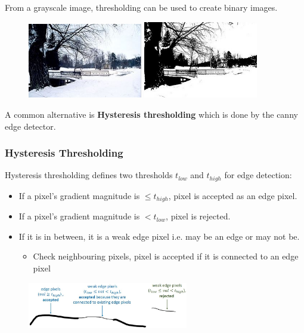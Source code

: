 \documentclass{report}
\begin{document}
From a grayscale image, thresholding can be used to create binary images. 
\begin{figure}[h]
    \centering
    \includegraphics[width=5cm]{Thresholding_1.JPG}
    \hspace{1cm}
    \includegraphics[width=5cm]{Thresholding_2.JPG}
\end{figure}

A common alternative is \textbf{Hysteresis thresholding} which is done by the
canny edge detector. 

\subsubsection{Hysteresis Thresholding}

Hysteresis thresholding defines two thresholds $t_{low}$ and $t_{high}$ for edge
detection:
\begin{itemize}
    \item If a pixel's gradient magnitude is $\leq t_{high}$, pixel is accepted as an edge pixel.
    \item If a pixel’s gradient magnitude is $< t_{low}$, pixel is rejected.
    \item If it is in between, it is a weak edge pixel i.e. may be an edge or may not be.
    \begin{itemize}
        \item Check neighbouring pixels, pixel is accepted if it is connected to an edge pixel
    \end{itemize}
\end{itemize}
\begin{figure}[h!]
    \centering
    \includegraphics[width=7cm]{Hysteresis thresholding.JPG}
\end{figure}
\end{document}
